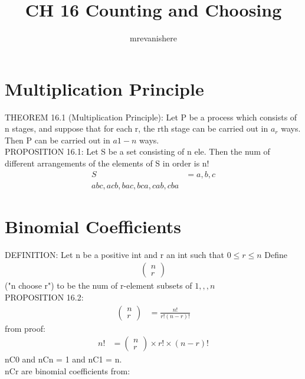 \documentclass[12pt]{article}
\begin{document}
\title{CH 16 Counting and Choosing}
\author{mrevanishere}
\maketitle


\section{Multiplication Principle}
	THEOREM 16.1 (Multiplication Principle): Let P be a process which 
	consists of n stages, and suppose that for each r, the rth stage
	can be carried out in $ a_r $ ways. Then P can be carried out
	in $ a1-n $ ways.\\
	PROPOSITION 16.1: Let S be a set consisting of n ele. Then the num
	of different arrangements of the elements of S in order is n!
	\begin{align*}
		S &= {a, b, c} \\
		abc, acb, bac, bca, cab, cba
	\end{align*}
\section{Binomial Coefficients}
	DEFINITION: Let n be a positive int and r an int such that 
	$ 0 \le r \le n $ Define
	\begin{align*}
		\begin{pmatrix} n \\ r \end{pmatrix}
	\end{align*}
	("n choose r") to be the num of r-element subsets of $ {1,,,n} $ \\
	PROPOSITION 16.2:
	\begin{align*}
		\begin{pmatrix} n \\ r \end{pmatrix} &= 
		\frac{n!}{r!(n-r)!} 
	\end{align*}
	from proof:
	\begin{align*}
		n! &= \begin{pmatrix} n \\ r \end{pmatrix} \times r! \times (n-r)!
	\end{align*}
	nC0 and nCn = 1 and nC1 = n. \\
	nCr are binomial coefficients from:
\end{document}
